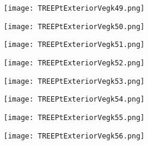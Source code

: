 \documentclass[pdf]{beamer}
\begin{document}
\begin{frame}
\begin{figure}[!h]
\centering
\texttt{[image: TREEPtExteriorVegk49.png]}
\end{figure}
\end{frame}

\begin{frame}
\begin{figure}[!h]
\centering
\texttt{[image: TREEPtExteriorVegk50.png]}
\end{figure}
\end{frame}

\begin{frame}
\begin{figure}[!h]
\centering
\texttt{[image: TREEPtExteriorVegk51.png]}
\end{figure}
\end{frame}

\begin{frame}
\begin{figure}[!h]
\centering
\texttt{[image: TREEPtExteriorVegk52.png]}
\end{figure}
\end{frame}

\begin{frame}
\begin{figure}[!h]
\centering
\texttt{[image: TREEPtExteriorVegk53.png]}
\end{figure}
\end{frame}

\begin{frame}
\begin{figure}[!h]
\centering
\texttt{[image: TREEPtExteriorVegk54.png]}
\end{figure}
\end{frame}

\begin{frame}
\begin{figure}[!h]
\centering
\texttt{[image: TREEPtExteriorVegk55.png]}
\end{figure}
\end{frame}

\begin{frame}
\begin{figure}[!h]
\centering
\texttt{[image: TREEPtExteriorVegk56.png]}
\end{figure}
\end{frame}
\end{document}
